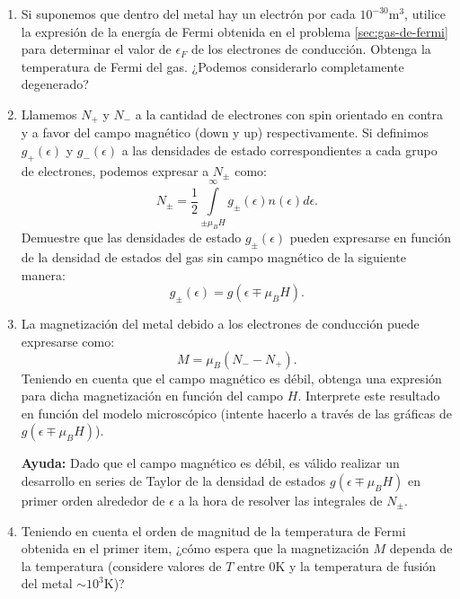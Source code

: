 \documentclass[a4paper,11pt]{article}
\begin{document}
\begin{enumerate}[label=(\alph*),
                  leftmargin=2\parindent,
                  rightmargin=2\parindent]

     \item{Si suponemos que dentro del metal hay un electrón por cada
           $10^{-30}$m$^3$, utilice la expresión de la energía de Fermi
           obtenida en el problema \ref{sec:gas-de-fermi} para determinar el
           valor de $\epsilon_F$ de los electrones de conducción.
           Obtenga la temperatura de Fermi del gas.
           ¿Podemos considerarlo completamente degenerado?
           }

     \item{Llamemos $N_+$ y $N_-$ a la cantidad de electrones con spin
           orientado en contra y a favor del campo magnético (down y up)
           respectivamente.
           Si definimos $g_+(\epsilon)$ y $g_-(\epsilon)$ a las densidades de
           estado correspondientes a cada grupo de electrones, podemos
           expresar a $N_\pm$ como:
           $$
           N_\pm =
           \frac{1}{2} \int\limits_{\pm \mu_B H}^{\infty}
           g_\pm(\epsilon) n(\epsilon) d\epsilon.
           $$
           Demuestre que las densidades de estado $g_\pm(\epsilon)$ pueden
           expresarse en función de la densidad de estados del gas sin campo
           magnético de la siguiente manera:
           $$ g_\pm(\epsilon) = g(\epsilon \mp \mu_B H). $$
           }

     \item{La magnetización del metal debido a los electrones de conducción
           puede expresarse como:
           $$ M = \mu_B (N_- - N_+). $$
           Teniendo en cuenta que el campo magnético es débil, obtenga una
           expresión para dicha magnetización en función del campo $H$.
           Interprete este resultado en función del modelo microscópico
           (intente hacerlo a través de las gráficas de
           $g(\epsilon \mp \mu_B H)$).
           }

     {\small \textbf{Ayuda:} Dado que el campo magnético es débil, es válido
     realizar un desarrollo en series de Taylor de la densidad de estados
     $g(\epsilon \mp \mu_B H)$ en primer orden alrededor de $\epsilon$ a la
     hora de resolver las integrales de $N_\pm$.
     }

     \item{Teniendo en cuenta el orden de magnitud de la temperatura de Fermi
           obtenida en el primer item, ¿cómo espera que la magnetización $M$
           dependa de la temperatura (considere valores de $T$ entre 0K y la
           temperatura de fusión del metal $\sim 10^3$K)?
           }

\end{enumerate}
\end{document}
